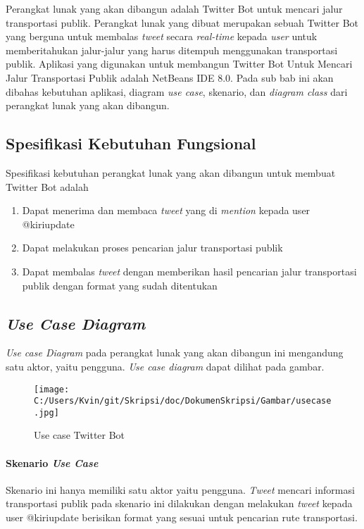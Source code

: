 Perangkat lunak yang akan dibangun adalah Twitter Bot untuk mencari jalur transportasi publik. Perangkat lunak yang dibuat merupakan sebuah Twitter Bot yang berguna untuk membalas \textit{tweet} secara \textit{real-time} kepada \textit{user} untuk memberitahukan jalur-jalur yang harus ditempuh menggunakan transportasi publik. Aplikasi yang digunakan untuk membangun Twitter Bot Untuk Mencari Jalur Transportasi Publik adalah NetBeans IDE 8.0. Pada sub bab ini akan dibahas kebutuhan aplikasi, diagram \textit{use case}, skenario, dan\textit{ diagram class} dari perangkat lunak yang akan dibangun.

\subsection{Spesifikasi Kebutuhan Fungsional}
Spesifikasi kebutuhan perangkat lunak yang akan dibangun untuk membuat Twitter Bot adalah
\begin{enumerate}
	\item Dapat menerima dan membaca \textit{tweet} yang di \textit{mention} kepada user @kiriupdate
	\item Dapat melakukan proses pencarian jalur transportasi publik
	\item Dapat membalas \textit{tweet} dengan memberikan hasil pencarian jalur transportasi publik dengan format yang sudah ditentukan
\end{enumerate}

\subsection{\textit{Use Case Diagram}}
\textit{Use case Diagram} pada perangkat lunak yang akan dibangun ini mengandung satu aktor, yaitu pengguna. \textit{Use case diagram} dapat dilihat pada gambar.

\begin{figure}[htbp]
	\centering
		\texttt{[image: C:/Users/Kvin/git/Skripsi/doc/DokumenSkripsi/Gambar/usecase.jpg]}
	\caption{Use case Twitter Bot}
	\label{fig:usecase}
\end{figure}

\paragraph{Skenario \textit{Use Case}}
Skenario ini hanya memiliki satu aktor yaitu pengguna. \textit{Tweet} mencari informasi transportasi publik pada skenario ini dilakukan dengan melakukan \textit{tweet} kepada user @kiriupdate berisikan format yang sesuai untuk pencarian rute transportasi. 

